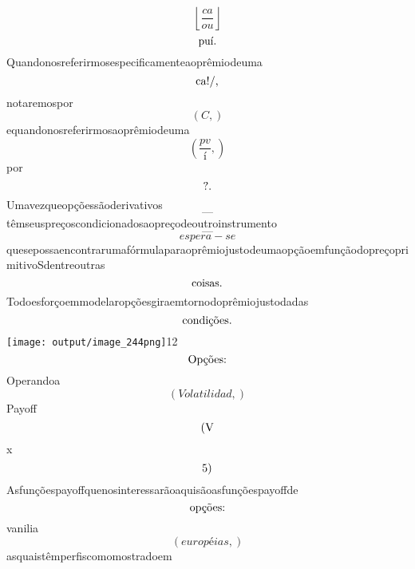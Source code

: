 \documentclass{article}
\begin{document}
\begin{equation}
\left\lfloor{\frac{ca}{ou}}\right\rfloor
\end{equation}\begin{equation}
$puí.$
\end{equation}Quandonosreferirmosespecificamenteaoprêmiodeuma\begin{equation}
$ca!/,$
\end{equation}notaremospor\begin{equation}
\left( C,\right)
\end{equation}equandonosreferirmosaoprêmiodeuma\begin{equation}
\left( \frac{pv}{í},\right)
\end{equation}por\begin{equation}
$?.$
\end{equation}Umavezqueopçõessãoderivativos\begin{equation}
—
\end{equation}têmseuspreçoscondicionadosaopreçodeoutroinstrumento\begin{equation}
—
\end{equation}\begin{equation}
espera - se
\end{equation}quesepossaencontrarumafórmulaparaoprêmiojustodeumaopçãoemfunçãodopreçoprimitivoSdentreoutras\begin{equation}
$coisas.$
\end{equation}Todoesforçoemmodelaropçõesgiraemtornodoprêmiojustodadas\begin{equation}
$condições.$
\end{equation}\texttt{[image: output/image\_244png]}12\begin{equation}
$Opções:$
\end{equation}Operandoa\begin{equation}
\left( Volatilidad,\right)
\end{equation}Payoff\begin{equation}
$(V$
\end{equation}x\begin{equation}
$5)$
\end{equation}Asfunçõespayoffquenosinteressarãoaquisãoasfunçõespayoffde\begin{equation}
$opções:$
\end{equation}vanilia\begin{equation}
\left( européias,\right)
\end{equation}asquaistêmperfiscomomostradoem\begin{equation}

\end{equation}
\end{document}
